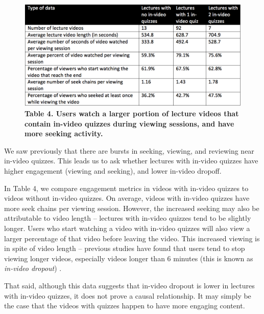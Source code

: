 \documentclass{sigchi}
\begin{document}
\begin{figure}
\includegraphics[width=1.0\columnwidth]{activity-level-vs-quizzes}
\small{\textbf{Table 4. Users watch a larger portion of lecture videos that contain in-video quizzes during viewing sessions, and have more seeking activity.}}
\label{fig:activity-level-vs-quizzes}
\end{figure}

We saw previously that there are bursts in seeking, viewing, and reviewing near in-video quizzes. This leads us to ask whether lectures with in-video quizzes have higher engagement (viewing and seeking), and lower in-video dropoff. %

In Table 4, we compare engagement metrics in videos with in-video quizzes to videos without in-video quizzes. On average, videos with in-video quizzes have more seek chains per viewing session. However, the increased seeking may also be attributable to video length -- lectures with in-video quizzes tend to be slightly longer. Users who start watching a video with in-video quizzes will also view a larger percentage of that video before leaving the video. This increased viewing is in spite of video length -- previous studies have found that users tend to stop viewing longer videos, especially videos longer than 6 minutes (this is known as \textit{in-video dropout}) \cite{juho}.

That said, although this data suggests that in-video dropout is lower in lectures with in-video quizzes, it does not prove a causal relationship. It may simply be the case that the videos with quizzes happen to have more engaging content.

\end{document}
